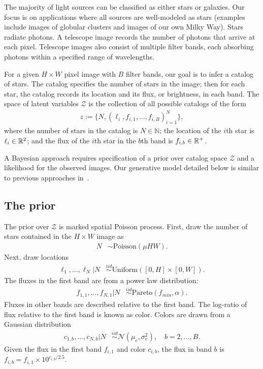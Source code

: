 The majority of light sources can be classified as either stars or galaxies. Our focus is on applications where all sources are well-modeled as stars (examples include images of globular clusters and images of our own Milky Way). 
Stars radiate photons. 
A telescope image records the number of photons that arrive at each pixel. Telescope images also consist of multiple filter bands, each absorbing photons within a specified range of wavelengths. 

For a given $H \times W$ pixel image with $B$ filter bands, our goal is to infer a catalog of 
stars. 
The catalog specifies the number of stars 
in the image; then for each star, the catalog 
records its location and its flux, or brightness,
in each band. 
The space of latent variables 
$\mathcal{Z}$ is the collection of all possible catalogs of the form
\begin{align}
    z := \{N, (\ell_i, f_{i,1}, ..., f_{i,B})_{i = 1}^N\},
    \label{eq:cat_formulation}
\end{align}
where the number of stars in the catalog
is $N\in\mathbb{N}$;
the location of the $i$th star is $\ell_i \in \mathbb{R}^2$; and 
the flux of the $i$th star in the $b$th band is $f_{i, b}\in\mathbb{R}^+$. 

A Bayesian approach requires specification of a prior over catalog space $\mathcal{Z}$ and a likelihood for the observed images. Our generative model detailed below is similar to previous approaches in~\cite{Brewer_2013, Portillo_2017, Feder_2019, regier2019_celeste}. 

\subsection{The prior}
The prior over $\mathcal{Z}$ is marked spatial Poisson process. First, draw the number of stars contained in the $H\times W$ image as
\begin{align}
	N &\sim \text{Poisson}(\mu HW).
\end{align}
Next, draw locations
\begin{align}
  \ell_1, ..., \ell_N | N &\stackrel{iid}{\sim} \text{Uniform}([0, H] \times [0, W]). 
 \end{align}
The fluxes in the first band are from a power law distribution:
\begin{align}
    f_{1, 1}, ..., f_{N,1} | N & 
    \stackrel{iid}{\sim} \text{Pareto}(f_{min}, \alpha) 
    \label{eq:flux_prior}.
\end{align}
Fluxes in other bands are described relative to the first band. The log-ratio of flux relative to the first band is
known as color. Colors are drawn from a Gaussian distribution
\begin{align}
  c_{1, b}, ..., c_{N,b} | N  & 
      \stackrel{iid}{\sim} \mathcal{N}(\mu_c, \sigma^2_c), \quad b = 2, ..., B.
\end{align}
Given the flux in the first band $f_{i,1}$ and color $c_{i,b}$,
the flux in band $b$ is  $f_{i,b} = f_{i,1} \times 10^{c_{i,b} / 2.5}$.

